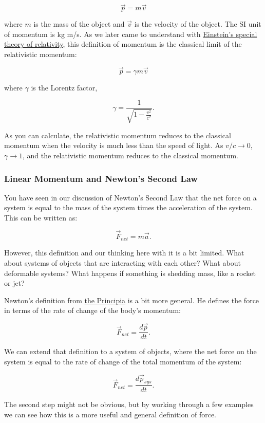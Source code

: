 \documentclass[11pt]{article}
\begin{document}
\[\vec{p} = m\vec{v}\]

where \(m\) is the mass of the object and \(\vec{v}\) is the velocity of
the object. The SI unit of momentum is kg m/s. As we later came to
understand with
\href{https://en.wikipedia.org/wiki/Special_relativity}{Einstein's
special theory of relativity}, this definition of momentum is the
classical limit of the relativistic momentum:

\[\vec{p} = \gamma m\vec{v}\]

where \(\gamma\) is the Lorentz factor,

\[\gamma = \frac{1}{\sqrt{1 - \frac{v^2}{c^2}}}.\]

As you can calculate, the relativistic momentum reduces to the classical
momentum when the velocity is much less than the speed of light. As
\(v/c \rightarrow 0\), \(\gamma \rightarrow 1\), and the relativistic
momentum reduces to the classical momentum.

    \subsubsection{Linear Momentum and Newton's Second
Law}\label{linear-momentum-and-newtons-second-law}

You have seen in our discussion of Newton's Second Law that the net
force on a system is equal to the mass of the system times the
acceleration of the system. This can be written as:

\[\vec{F}_{net}=m\vec{a}.\]

However, this definition and our thinking here with it is a bit limited.
What about systems of objects that are interacting with each other? What
about deformable systems? What happens if something is shedding mass,
like a rocket or jet?

Newton's definition from
\href{https://en.wikipedia.org/wiki/Philosophi\%C3\%A6_Naturalis_Principia_Mathematica}{the
Principia} is a bit more general. He defines the force in terms of the
rate of change of the body's momentum:

\[\vec{F}_{net}=\frac{d\vec{p}}{dt}.\]

We can extend that definition to a system of objects, where the net
force on the system is equal to the rate of change of the total momentum
of the system:

\[\vec{F}_{net}=\frac{d\vec{p}_{sys}}{dt}.\]

The second step might not be obvious, but by working through a few
examples we can see how this is a more useful and general definition of
force.
\end{document}
